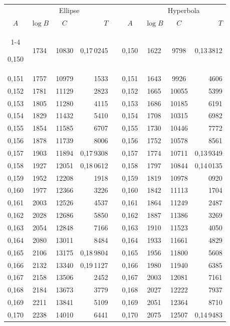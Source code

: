 \begin{tabular}{|c|c|c|r|@{}p{9pt}@{}|c|c|c|r|}
\hline
\rule{0pt}{8.5pt} & \multicolumn{3}{c|}{Ellipse} & & & \multicolumn{3}{c|}{Hyperbola} \\
\(A\) & \(\log B\) & \(C\) & \(T\) & & \(A\) & \(\log B\) & \(C\) & \(T\) \\
\cline{1-4}\cline{6-9}
\rule{0pt}{8.5pt}0,150 & 1734 & 10830 & 0,17\,0245 &  & 0,150 & 1622 & 9798 & 0,13\,3812 \\
0,151 & 1757 & 10979 & 1533 &  & 0,151 & 1643 & 9926 & 4606 \\
0,152 & 1781 & 11129 & 2823 &  & 0,152 & 1665 & 10055 & 5399 \\
0,153 & 1805 & 11280 & 4115 &  & 0,153 & 1686 & 10185 & 6191 \\
0,154 & 1829 & 11432 & 5410 &  & 0,154 & 1708 & 10315 & 6982 \\
0,155 & 1854 & 11585 & 6707 &  & 0,155 & 1730 & 10446 & 7772 \\[3pt]
0,156 & 1878 & 11739 & 8006 &  & 0,156 & 1752 & 10578 & 8561 \\
0,157 & 1903 & 11894 & 0,17\,9308 &  & 0,157 & 1774 & 10711 & 0,13\,9349 \\
0,158 & 1927 & 12051 & 0,18\,0612 &  & 0,158 & 1797 & 10844 & 0,14\,0135 \\
0,159 & 1952 & 12208 & 1918 &  & 0,159 & 1819 & 10978 & 0920 \\
0,160 & 1977 & 12366 & 3226 &  & 0,160 & 1842 & 11113 & 1704 \\[3pt]
0,161 & 2003 & 12526 & 4537 &  & 0,161 & 1864 & 11249 & 2487 \\
0,162 & 2028 & 12686 & 5850 &  & 0,162 & 1887 & 11386 & 3269 \\
0,163 & 2054 & 12848 & 7166 &  & 0,163 & 1910 & 11523 & 4050 \\
0,164 & 2080 & 13011 & 8484 &  & 0,164 & 1933 & 11661 & 4829 \\
0,165 & 2106 & 13175 & 0,18\,9804 &  & 0,165 & 1956 & 11800 & 5608 \\[3pt]
0,166 & 2132 & 13340 & 0,19\,1127 &  & 0,166 & 1980 & 11940 & 6385 \\
0,167 & 2158 & 13506 & 2452 &  & 0,167 & 2003 & 12081 & 7161 \\
0,168 & 2184 & 13673 & 3779 &  & 0,168 & 2027 & 12222 & 7937 \\
0,169 & 2211 & 13841 & 5109 &  & 0,169 & 2051 & 12364 & 8710 \\
0,170 & 2238 & 14010 & 6441 &  & 0,170 & 2075 & 12507 & 0,14\,9483 \\[3pt]

\end{tabular}
